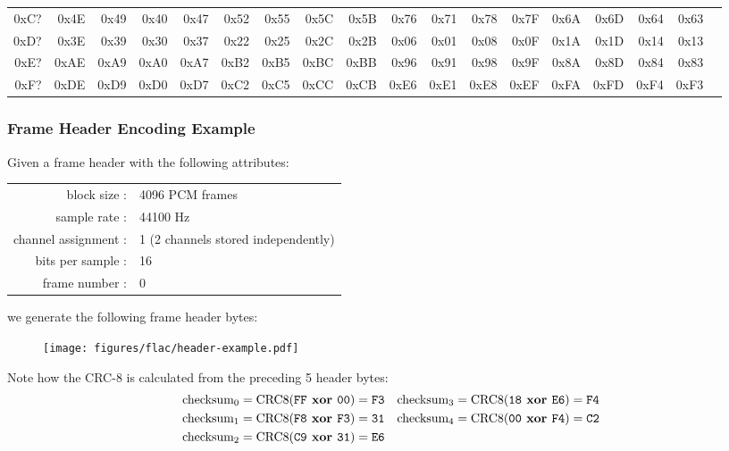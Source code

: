 \begin{table}[h]
{\begin{tabular}{|r||r|r|r|r|r|r|r|r|r|r|r|r|r|r|r|r|r|}
0xC? & 0x4E & 0x49 & 0x40 & 0x47 & 0x52 & 0x55 & 0x5C & 0x5B & 0x76 & 0x71 & 0x78 & 0x7F & 0x6A & 0x6D & 0x64 & 0x63 \\
0xD? & 0x3E & 0x39 & 0x30 & 0x37 & 0x22 & 0x25 & 0x2C & 0x2B & 0x06 & 0x01 & 0x08 & 0x0F & 0x1A & 0x1D & 0x14 & 0x13 \\
0xE? & 0xAE & 0xA9 & 0xA0 & 0xA7 & 0xB2 & 0xB5 & 0xBC & 0xBB & 0x96 & 0x91 & 0x98 & 0x9F & 0x8A & 0x8D & 0x84 & 0x83 \\
0xF? & 0xDE & 0xD9 & 0xD0 & 0xD7 & 0xC2 & 0xC5 & 0xCC & 0xCB & 0xE6 & 0xE1 & 0xE8 & 0xEF & 0xFA & 0xFD & 0xF4 & 0xF3 \\
\hline
\end{tabular}
}
\end{table}

\subsubsection{Frame Header Encoding Example}
Given a frame header with the following attributes:
\begin{table}[h]
\begin{tabular}{rl}
block size : & 4096 PCM frames \\
sample rate : & 44100 Hz \\
channel assignment : & 1 (2 channels stored independently) \\
bits per sample : & 16 \\
frame number : & 0
\end{tabular}
\end{table}
\par
\noindent
we generate the following frame header bytes:
\begin{figure}[h]
\texttt{[image: figures/flac/header-example.pdf]}
\end{figure}
\par
\noindent
Note how the CRC-8 is calculated from the preceding 5 header bytes:
\begin{align*}
\text{checksum}_0 = \text{CRC8}(\texttt{FF}\textbf{ xor }\texttt{00}) = \texttt{F3} & &
\text{checksum}_3 = \text{CRC8}(\texttt{18}\textbf{ xor }\texttt{E6}) = \texttt{F4} \\
\text{checksum}_1 = \text{CRC8}(\texttt{F8}\textbf{ xor }\texttt{F3}) = \texttt{31} & &
\text{checksum}_4 = \text{CRC8}(\texttt{00}\textbf{ xor }\texttt{F4}) = \texttt{C2} \\
\text{checksum}_2 = \text{CRC8}(\texttt{C9}\textbf{ xor }\texttt{31}) = \texttt{E6} \\
\end{align*}

